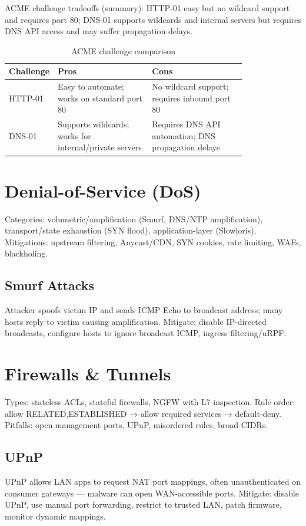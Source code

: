 \documentclass[11pt]{article}
\begin{document}
ACME challenge tradeoffs (summary): HTTP-01 easy but no wildcard support and requires port 80; DNS-01 supports wildcards and internal servers but requires DNS API access and may suffer propagation delays.

\begin{table}[h]
\centering
\begin{tabular}{l p{0.4\linewidth} p{0.4\linewidth}}
\toprule
Challenge & Pros & Cons \\
\midrule
HTTP-01 & Easy to automate; works on standard port 80 & No wildcard support; requires inbound port 80 \\
DNS-01 & Supports wildcards; works for internal/private servers & Requires DNS API automation; DNS propagation delays \\
\bottomrule
\end{tabular}
\caption{ACME challenge comparison}
\end{table}

\section{Denial-of-Service (DoS)}
Categories: volumetric/amplification (Smurf, DNS/NTP amplification), transport/state exhaustion (SYN flood), application-layer (Slowloris). Mitigations: upstream filtering, Anycast/CDN, SYN cookies, rate limiting, WAFs, blackholing.

\subsection{Smurf Attacks}
Attacker spoofs victim IP and sends ICMP Echo to broadcast address; many hosts reply to victim causing amplification. Mitigate: disable IP-directed broadcasts, configure hosts to ignore broadcast ICMP, ingress filtering/uRPF.

\section{Firewalls \& Tunnels}
Types: stateless ACLs, stateful firewalls, NGFW with L7 inspection. Rule order: allow RELATED,ESTABLISHED → allow required services → default-deny. Pitfalls: open management ports, UPnP, misordered rules, broad CIDRs.

\subsection{UPnP}
UPnP allows LAN apps to request NAT port mappings, often unauthenticated on consumer gateways — malware can open WAN-accessible ports. Mitigate: disable UPnP, use manual port forwarding, restrict to trusted LAN, patch firmware, monitor dynamic mappings.
\end{document}
